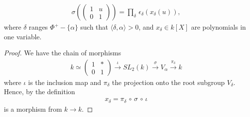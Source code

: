 \begin{lemma} \label{claim1}
\begin{eqnarray*}
\sigma\left(\left(\begin{matrix} 1 & u \\ 0 & 1 \end{matrix}\right)\right) = \prod_\delta\, \epsilon_\delta\left(x_\delta\left(u\right)\right),
\end{eqnarray*}
where $\delta$ ranges $\Phi^+ - \{\alpha\}$ such that $\langle \delta, \alpha \rangle > 0$, and $x_\delta\in k[X]$ are polynomials in one variable.
\end{lemma}
\begin{proof}
We have the chain of morphisms
\begin{eqnarray*}
k\simeq \left(\begin{matrix}1 & * \\ 0 & 1\end{matrix}\right) 
\stackrel{\iota}\longrightarrow SL_2(k) 
\stackrel{\sigma}\longrightarrow V_\alpha 
\stackrel{\pi_\delta}\longrightarrow k
\end{eqnarray*}
where $\iota$ is the inclusion map and $\pi_\delta$ the projection onto the root subgroup $V_\delta$. Hence, by the definition
\begin{eqnarray*}
x_\delta = \pi_\delta\, \circ\, \sigma\, \circ\, \iota
\end{eqnarray*}
is a morphism from $k \rightarrow k$.


\end{proof}
